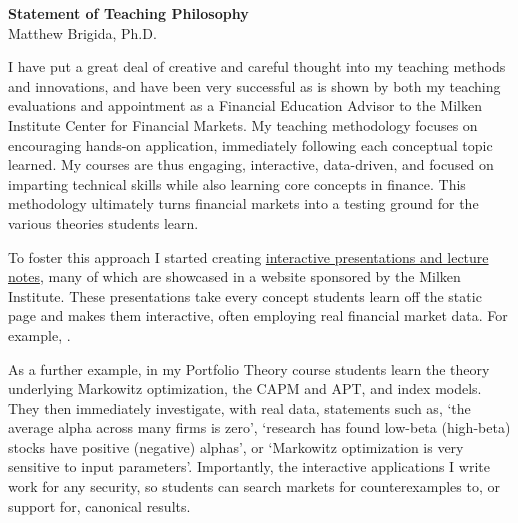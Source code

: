 \documentclass[12pt]{article}
\begin{document}
\begin{center}
{\bf Statement of Teaching Philosophy} \\
Matthew Brigida, Ph.D.
\end{center}
\vspace*{1cm}
I have put a great deal of creative and careful thought into my teaching methods and innovations, and have been very successful as is shown by both my teaching evaluations and appointment as a Financial Education Advisor to the Milken Institute Center for Financial Markets.  My teaching methodology focuses on encouraging hands-on application, immediately following each conceptual topic learned. My courses are thus engaging, interactive, data-driven, and focused on imparting technical skills while also learning core concepts in finance.  This methodology ultimately turns financial markets into a testing ground for the various theories students learn.  

To foster this approach I started creating {\color{Blue}\href{https://financial-education.github.io/index.html}{interactive presentations and lecture notes}}, many of which are showcased in a website sponsored by the Milken Institute.  These presentations take every concept students learn off the static page and makes them interactive, often employing real financial market data. For example, \href{https://matt-brigida.github.io/fin_532_market_depth/}{\color{Blue}{this presentation uses 30-second frequency data for TWTR stock and option prices to show students how prices react to volume}}.

As a further example, in my Portfolio Theory course students learn the theory underlying Markowitz optimization, the CAPM and APT, and index models. They then immediately investigate, with real data, statements such as, `the average alpha across many firms is zero', `research has found low-beta (high-beta) stocks have positive (negative) alphas', or `Markowitz optimization is very sensitive to input parameters'.  Importantly, the interactive applications I write work for any security, so students can search markets for counterexamples to, or support for, canonical results.

\end{document}
